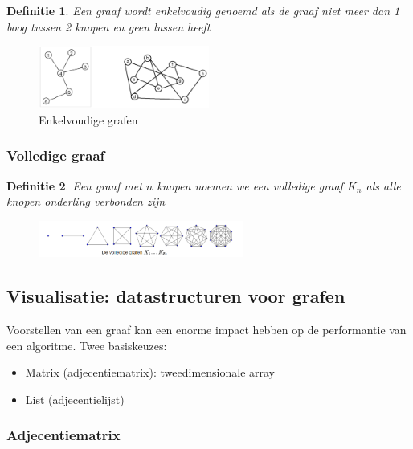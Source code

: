 \documentclass{article}
\newtheorem{theorem}{Definitie}[section]
\begin{document}
\begin{theorem}
    Een graaf wordt enkelvoudig genoemd als de graaf niet meer dan 1 boog tussen 2 knopen en geen lussen heeft
\end{theorem}

\begin{figure}[H]
    \centering
    \includegraphics[width=0.5\textwidth]{enkelvoudige-graaf.png}
    \caption{Enkelvoudige grafen}
\end{figure}

\subsubsection{Volledige graaf}

\begin{theorem}
    Een graaf met $n$ knopen noemen we een volledige graaf $K_n$ als alle knopen onderling verbonden zijn
\end{theorem}

\begin{figure}[H]
    \centering
    \includegraphics[width=0.6\textwidth]{volledige-grafen.png}
\end{figure}

\subsection{Visualisatie: datastructuren voor grafen}

Voorstellen van een graaf kan een enorme impact hebben op de performantie van een algoritme. Twee basiskeuzes:

\begin{itemize}
    \item Matrix (adjecentiematrix): tweedimensionale array
    \item List (adjecentielijst)
\end{itemize}

\subsubsection{Adjecentiematrix}
\end{document}
